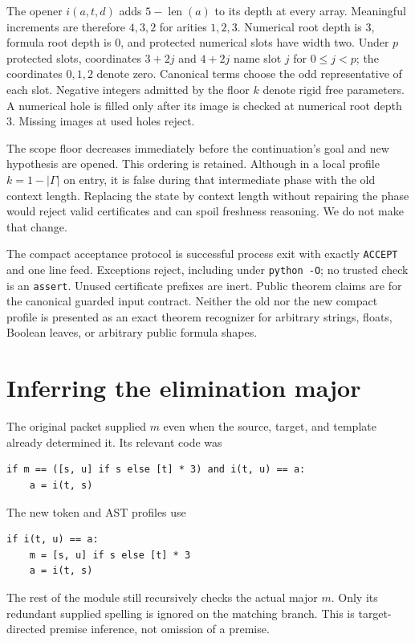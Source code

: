 \documentclass[11pt]{article}
\theoremstyle{definition}
\theoremstyle{remark}
\begin{document}
The opener $i(a,t,d)$ adds $5-\operatorname{len}(a)$ to its depth at every
array.  Meaningful increments are therefore $4,3,2$ for arities $1,2,3$.
Numerical root depth is $3$, formula root depth is $0$, and protected
numerical slots have width two.  Under $p$ protected slots, coordinates
$3+2j$ and $4+2j$ name slot $j$ for $0\le j<p$; the coordinates $0,1,2$
denote zero.  Canonical terms choose the odd representative of each slot.
Negative integers admitted by the floor $k$ denote rigid free parameters.
A numerical hole is filled only after its image is checked at numerical
root depth $3$.  Missing images at used holes reject.

The scope floor decreases immediately before the continuation's goal and
new hypothesis are opened.  This ordering is retained.  Although in a
local profile $k=1-|\Gamma|$ on entry, it is false during that intermediate
phase with the old context length.  Replacing the state by context length
without repairing the phase would reject valid certificates and can spoil
freshness reasoning.  We do not make that change.

The compact acceptance protocol is successful process exit with exactly
\texttt{ACCEPT} and one line feed.  Exceptions reject, including under
\texttt{python -O}; no trusted check is an \texttt{assert}.  Unused
certificate prefixes are inert.  Public theorem claims are for the
canonical guarded input contract.  Neither the old nor the new compact
profile is presented as an exact theorem recognizer for arbitrary strings,
floats, Boolean leaves, or arbitrary public formula shapes.

\section{Inferring the elimination major}
\label{sec:inferred}

The original packet supplied $m$ even when the source, target, and template
already determined it.  Its relevant code was
\begin{lstlisting}
if m == ([s, u] if s else [t] * 3) and i(t, u) == a:
    a = i(t, s)
\end{lstlisting}
The new token and AST profiles use
\begin{lstlisting}
if i(t, u) == a:
    m = [s, u] if s else [t] * 3
    a = i(t, s)
\end{lstlisting}
The rest of the module still recursively checks the actual major $m$.
Only its redundant supplied spelling is ignored on the matching branch.
This is target-directed premise inference, not omission of a premise.
\end{document}
